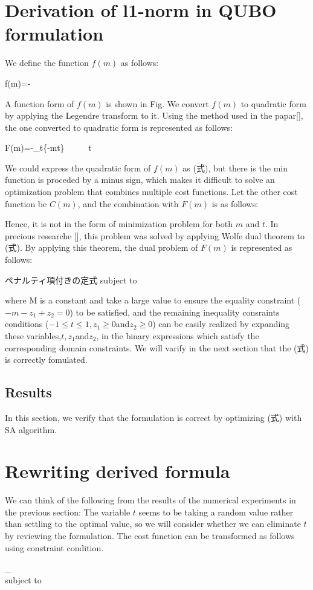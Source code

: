 \documentclass[fp,twocolumn]{jpsj3}
\begin{document}
\section{Derivation of l1-norm in QUBO formulation} %
We define the function $f(m)$ as follows:
\begin{}
  f(m)=-
\end{}
A function form of $f(m)$ is shown in Fig. We convert $f(m)$ to quadratic form by applying the Legendre transform to it. Using the method used in the papar[], the one converted to quadratic form is represented as follows:
\begin{}
  F(m)=-\min_{t}{\{-mt\}} \  \  \  \leq t 
\end{}
We could express the quadratic form of $f(m)$ as (式), but there is the min function is proceded by a minus sign, which makes it difficult to solve an optimization problem that combines multiple cost functions. Let the other cost function be $C(m)$, and the combination with $F(m)$ is as follows:
\begin{}
\end{}
Hence, it is not in the form of minimization problem for both $m$ and $t$.
In precious researche [], this problem was solved by applying Wolfe dual theorem to (式). By applying this theorem, the dual problem of $F(m)$ is represented as follows:
\begin{}
ペナルティ項付きの定式
subject to 
\end{}
where M is a constant and take a large value to ensure the equality constraint ($-m-z_{1}+z_{2}=0$) to be satisfied, and the remaining inequality consraints conditions ($-1\leq t\leq 1, z_{1}\geq 0$and$z_{2}\geq 0$) can be easily realized by expanding these variables,$t,z_{1}$and$z_{2}$, in the binary expressions which satisfy the corresponding domain constraints. We will varify in the next section that the (式) is correctly fomulated. 

\subsection{Results} %
In this section, we verify that the formulation is correct by optimizing (式) with SA algorithm. 

\section{Rewriting derived formula} %
We can think of the following from the results of the numerical experiments in the previous section: The variable $t$ seems to be taking a random value rather than settling to the optimal value, so we will consider whether we can eliminate $t$ by reviewing the formulation. 
The cost function can be transformed as follows using constraint condition.
\begin{}
\min_{}{} \\
subject to 
\end{}
\end{document}
